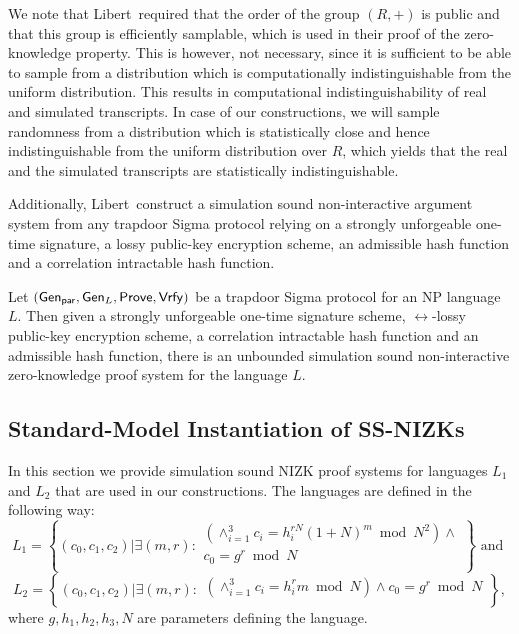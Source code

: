 \begin{remark}
We note that Libert~\etal required that the order of the group $(R,+)$ is public and that this group is efficiently samplable, which is used in their proof of the zero-knowledge property. This is however, not necessary, since it is sufficient to be able to sample from a distribution which is computationally indistinguishable from the uniform distribution. This results in computational indistinguishability of real and simulated transcripts. In case of our constructions, we will sample randomness from a distribution which is statistically close and hence indistinguishable from the uniform distribution over $R$, which yields that the real and the simulated transcripts are statistically indistinguishable. 
\end{remark}

Additionally, Libert~\etal construct a simulation sound non-interactive argument system from any trapdoor Sigma protocol relying on a strongly unforgeable one-time signature, a lossy public-key encryption scheme, an admissible hash function and a correlation intractable hash function. 

\begin{theorem}\label{thm:nizk}
Let $(\mathsf{Gen}_{\mathsf{par}}, \mathsf{Gen}_L, \mathsf{Prove}, \mathsf{Vrfy})$ be a trapdoor Sigma protocol for an NP language $L$. Then given a strongly unforgeable one-time signature scheme, $\rel$-lossy public-key encryption scheme, a correlation intractable hash function and an admissible hash function, there is an unbounded simulation sound non-interactive zero-knowledge proof system for the language $L$. 
\end{theorem}

\subsection{Standard-Model Instantiation of SS-NIZKs}\label{sec:nizk-crs}
In this section we provide simulation sound NIZK proof systems for languages $L_1$ and $L_2$ that are used in our constructions. The languages are defined in the following way:  
\[
L_1 = \left\{(c_0, c_1, c_2)| \exists (m,r):
\begin{aligned}
       (\land_{i=1}^3 c_i = h_i^{rN}(1+N)^m \bmod N^2) \land \\
       c_0 = g^r \bmod N\\
    \end{aligned}
    \right\} \text{ and } 
\]
\[
L_2 = \left\{(c_0, c_1, c_2)| \exists (m,r):
\begin{aligned}
       (\land_{i=1}^3 c_i = h_i^{r}m \bmod N) \land
       c_0 = g^r \bmod N\\
    \end{aligned}
    \right\},   
\]
where $g, h_1, h_2, h_3, N$ are parameters defining the language. 

